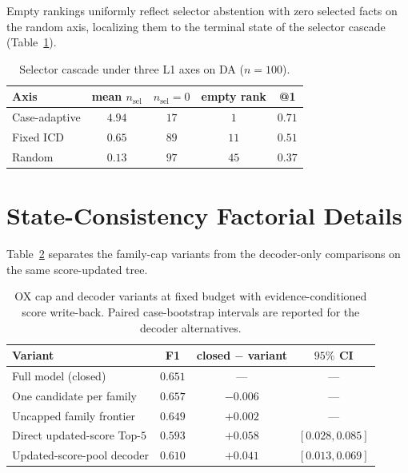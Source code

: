 \documentclass[letterpaper]{article}
\begin{document}
Empty rankings uniformly reflect selector abstention with zero selected facts on the random axis, localizing them to the terminal state of the selector cascade (Table~\ref{tab:org-cascade}).

\begin{table}[tb]
\centering
\small
\begin{tabular}{@{}lcccc@{}}
\toprule
Axis & mean $n_{\mathrm{sel}}$ & $n_{\mathrm{sel}}{=}0$ & empty rank & @1 \\
\midrule
Case-adaptive & $4.94$ & $17$ & $1$ & $0.71$ \\
Fixed ICD & $0.65$ & $89$ & $11$ & $0.51$ \\
Random & $0.13$ & $97$ & $45$ & $0.37$ \\
\bottomrule
\end{tabular}
\caption{Selector cascade under three L1 axes on DA ($n{=}100$).}
\label{tab:org-cascade}
\end{table}

\section{State-Consistency Factorial Details}

Table~\ref{tab:state-detail} separates the family-cap variants from the decoder-only comparisons on the same score-updated tree.

\begin{table}[tb]
\centering
\small
\begin{tabular}{@{}p{2.35cm}ccc@{}}
\toprule
Variant & F1 & closed $-$ variant & $95\%$ CI \\
\midrule
Full model (closed) & $0.651$ & --- & --- \\
One candidate per family & $0.657$ & $-0.006$ & --- \\
Uncapped family frontier & $0.649$ & $+0.002$ & --- \\
Direct updated-score Top-$5$ & $0.593$ & $+0.058$ & $[0.028,0.085]$ \\
Updated-score-pool decoder & $0.610$ & $+0.041$ & $[0.013,0.069]$ \\
\bottomrule
\end{tabular}
\caption{OX cap and decoder variants at fixed budget with evidence-conditioned score write-back. Paired case-bootstrap intervals are reported for the decoder alternatives.}
\label{tab:state-detail}
\end{table}
\end{document}
